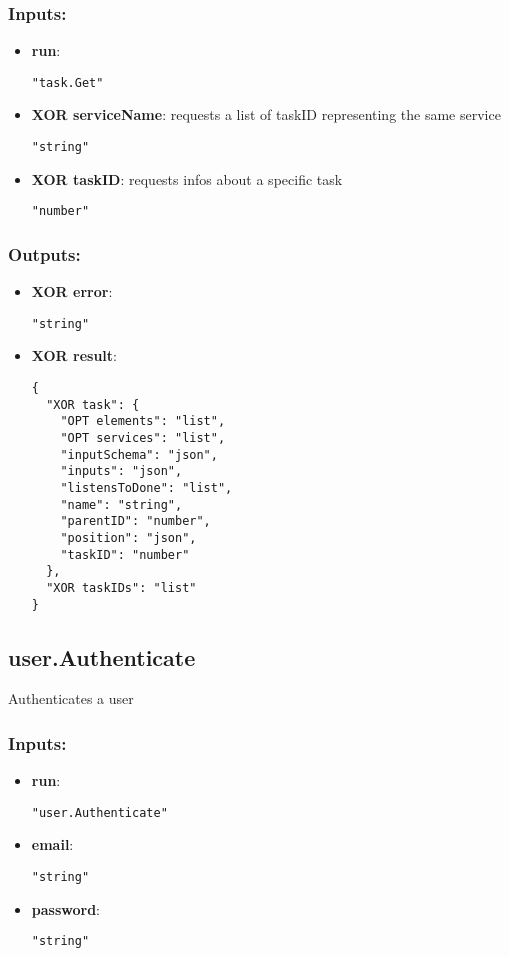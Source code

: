 \subsubsection*{Inputs:}
\begin{itemize}
    \item \textbf{run}: 
\begin{lstlisting}
"task.Get"
\end{lstlisting}
    \item \textbf{XOR serviceName}: requests a list of taskID representing the same service
\begin{lstlisting}
"string"
\end{lstlisting}
    \item \textbf{XOR taskID}: requests infos about a specific task
\begin{lstlisting}
"number"
\end{lstlisting}
  \end{itemize}

\subsubsection*{Outputs:}
\begin{itemize}
    \item \textbf{XOR error}: 
\begin{lstlisting}
"string"
\end{lstlisting}
    \item \textbf{XOR result}: 
\begin{lstlisting}
{
  "XOR task": {
    "OPT elements": "list", 
    "OPT services": "list", 
    "inputSchema": "json", 
    "inputs": "json", 
    "listensToDone": "list", 
    "name": "string", 
    "parentID": "number", 
    "position": "json", 
    "taskID": "number"
  }, 
  "XOR taskIDs": "list"
}
\end{lstlisting}
  \end{itemize}

\subsection{user.Authenticate}
Authenticates a user
\subsubsection*{Inputs:}
\begin{itemize}
    \item \textbf{run}: 
\begin{lstlisting}
"user.Authenticate"
\end{lstlisting}
    \item \textbf{email}: 
\begin{lstlisting}
"string"
\end{lstlisting}
    \item \textbf{password}: 
\begin{lstlisting}
"string"
\end{lstlisting}
  \end{itemize}

